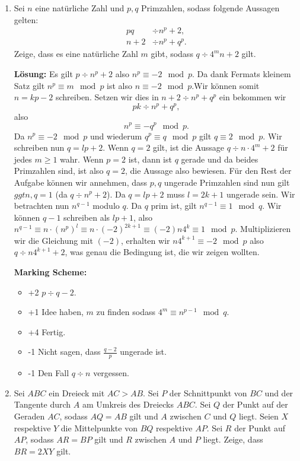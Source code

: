 \documentclass[language=german,style=solution]{smo}
\begin{document}
\begin{enumerate}[label=\textbf{\arabic*.}]
\newpage

\item Sei $n$ eine natürliche Zahl und $p,q$ Primzahlen, sodass folgende Aussagen gelten:
\begin{align*}
pq &\div n^p + 2,\\
n + 2 &\div n^p + q^p.
\end{align*}
Zeige, dass es eine natürliche Zahl $m$ gibt, sodass $q \div 4^m n +2$ gilt.

\textbf{Lösung:}
Es gilt $p\div n^p+2$ also $n^p\equiv -2 \mod{p}$. Da dank Fermats kleinem Satz gilt $n^p\equiv m\mod{p}$ ist also $n\equiv-2\mod{p}$.Wir können somit $n=kp-2$ schreiben. Setzen wir dies in $n+2\div n^p+q^p$ ein bekommen wir 
\[
pk\div n^p+q^p,
\]
also 
\[
n^p\equiv -q^p\mod{p}.
\] 
Da $n^p\equiv -2\mod{p}$ und wiederum $q^p\equiv q\mod{p}$ gilt $q\equiv 2\mod{p}$. Wir schreiben nun $q=lp+2$. Wenn $q=2$ gilt, ist die Aussage $q\div n\cdot 4^m+2$ für jedes $m\geq 1$ wahr. Wenn $p=2$ ist, dann ist $q$ gerade und da beides Primzahlen sind, ist also $q=2$, die Aussage also bewiesen. Für den Rest der Aufgabe können wir annehmen, dass $p, q$ ungerade Primzahlen sind nun gilt $ggt{n, q}=1$ (da $q\div n^p+2$). Da $q=lp+2$ muss $l=2k+1$ ungerade sein. Wir betrachten nun $n^{q-1}$ modulo $q$. Da $q$ prim ist, gilt $n^{q-1}\equiv 1\mod{q}$. Wir können $q-1$ schreiben als $lp+1$, also $n^{q-1}\equiv n\cdot (n^{p})^l \equiv n\cdot (-2)^{2k+1}\equiv (-2)n4^k\equiv 1\mod{p}$. Multiplizieren wir die Gleichung mit $(-2)$, erhalten wir $n4^{k+1}\equiv-2\mod{p}$ also $q\div n4^{k+1}+2$, was genau die Bedingung ist, die wir zeigen wollten. 
	
\textbf{Marking Scheme:}
\begin{itemize}
	\item +2 $p\div q-2$.
	\item +1 Idee haben, $m$ zu finden sodass $4^m \equiv n^{p-1}\mod q$.
	\item +4 Fertig.
	\item -1 Nicht sagen, dass $\frac{q-2}{p}$ ungerade ist.
	\item -1 Den Fall $q\div n$ vergessen.
\end{itemize}

\newpage

\item Sei $ABC$ ein Dreieck mit $AC > AB$. Sei $P$ der Schnittpunkt von $BC$ und der Tangente durch $A$ am Umkreis des Dreiecks $ABC$. Sei $Q$ der Punkt auf der Geraden $AC$, sodass $AQ = AB$ gilt und $A$ zwischen $C$ und $Q$ liegt. Seien $X$ respektive $Y$ die Mittelpunkte von $BQ$ respektive $AP$. Sei $R$ der Punkt auf $AP$, sodass $AR=BP$ gilt und $R$ zwischen $A$ und $P$ liegt. Zeige, dass $BR = 2XY$ gilt.


\end{enumerate}
\end{document}
